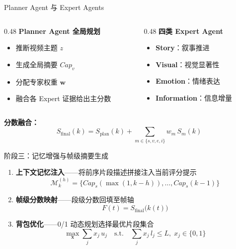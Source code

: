 \begin{frame}{Planner Agent 与 Expert Agents}
  \begin{columns}[T]
    \begin{column}{0.48\textwidth}
      \textbf{Planner Agent 全局规划}
      \begin{itemize}
        \item 推断视频主题 $z$
        \item 生成全局摘要 $Cap_v$
        \item 分配专家权重 $\mathbf{w}$
        \item 融合各 Expert 证据给出主分数
      \end{itemize}
    \end{column}
    \begin{column}{0.48\textwidth}
      \textbf{四类 Expert Agent}
      \begin{itemize}
        \item \textbf{Story}：叙事推进
        \item \textbf{Visual}：视觉显著性
        \item \textbf{Emotion}：情绪表达
        \item \textbf{Information}：信息增量
      \end{itemize}
    \end{column}
  \end{columns}
  \vfill
  \textbf{分数融合：}
  \begin{equation*}
    S_{\mathrm{final}}(k) = S_{\mathrm{plan}}(k) + \sum_{m\in\{s,v,e,i\}} w_m \, S_m(k)
  \end{equation*}
\end{frame}

\begin{frame}{阶段三：记忆增强与帧级摘要生成}
  \begin{enumerate}
    \item \textbf{上下文记忆注入}——将前序片段描述拼接注入当前评分提示
      \begin{equation*}
        \mathcal{M}_k^{(h)}=\{Cap_s(\max(1,k{-}h)),\ldots,Cap_s(k{-}1)\}
      \end{equation*}
    \item \textbf{帧级分数映射}——段级分数回填至帧轴
      \begin{equation*}
        F(t)=S_{\mathrm{final}}\big(k(t)\big)
      \end{equation*}
    \item \textbf{背包优化}——0/1 动态规划选择最优片段集合
      \begin{equation*}
        \max_{\mathbf{x}} \sum_{j} x_j\,u_j \quad \text{s.t.}\quad \sum_{j} x_j\,l_j \le L,\; x_j\in\{0,1\}
      \end{equation*}
  \end{enumerate}
\end{frame}

